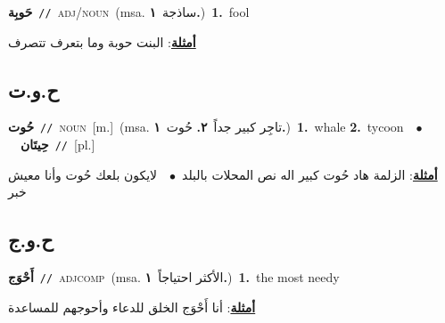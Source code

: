 \documentclass[10pt,a4paper,twoside]{article} %
\begin{document}
\begin{multicols}{2}
{\setlength\topsep{0pt}\textbf{\foreignlanguage{arabic}{حَوبِة}}\ {\color{gray}\texttt{//}\color{black}}\ \textsc{adj/noun}\ \color{gray}(msa. \foreignlanguage{arabic}{ساذجة}~\foreignlanguage{arabic}{\textbf{١.}})\color{black}\ \textbf{1.}~fool\  \begin{flushright}\color{gray}\foreignlanguage{arabic}{\textbf{\underline{\foreignlanguage{arabic}{أمثلة}}}: البنت حوبة وما بتعرف تتصرف}\end{flushright}\color{black}} \vspace{2mm}

\vspace{-3mm}
\subsection*{\color{blue}\foreignlanguage{arabic}{ح.و.ت}\color{blue}{}} 

{\setlength\topsep{0pt}\textbf{\foreignlanguage{arabic}{حُوت}}\ {\color{gray}\texttt{//}\color{black}}\ \textsc{noun}\ [m.]\ \color{gray}(msa. \foreignlanguage{arabic}{تاجِر كبير جداً}~\foreignlanguage{arabic}{\textbf{٢.}}  \foreignlanguage{arabic}{حُوت}~\foreignlanguage{arabic}{\textbf{١.}})\color{black}\ \textbf{1.}~whale  \textbf{2.}~tycoon\ \ $\bullet$\ \ \setlength\topsep{0pt}\textbf{\foreignlanguage{arabic}{حِيتَان}}\ {\color{gray}\texttt{//}\color{black}}\ [pl.]\  \begin{flushright}\color{gray}\foreignlanguage{arabic}{\textbf{\underline{\foreignlanguage{arabic}{أمثلة}}}: الزلمة هاد حُوت كبير اله نص المحلات بالبلد\ $\bullet$\ \  لايكون بلعك حُوت وأنا معيش خبر}\end{flushright}\color{black}} \vspace{2mm}

\vspace{-3mm}
\subsection*{\color{blue}\foreignlanguage{arabic}{ح.و.ج}\color{blue}{}} 

{\setlength\topsep{0pt}\textbf{\foreignlanguage{arabic}{أَحْوَج}}\ {\color{gray}\texttt{//}\color{black}}\ \textsc{adj\textunderscore comp}\ \color{gray}(msa. \foreignlanguage{arabic}{الأكثر احتياجاً}~\foreignlanguage{arabic}{\textbf{١.}})\color{black}\ \textbf{1.}~the most needy\  \begin{flushright}\color{gray}\foreignlanguage{arabic}{\textbf{\underline{\foreignlanguage{arabic}{أمثلة}}}: أنا أَحْوَج الخلق للدعاء وأحوجهم للمساعدة}\end{flushright}\color{black}} \vspace{2mm}


\end{multicols}
\end{document}
